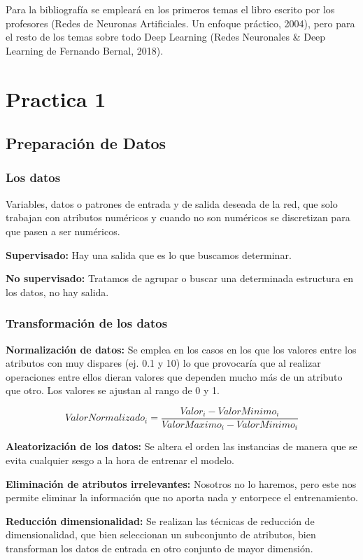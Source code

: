 \documentclass[12pt, twoside, openright]{report} %
\begin{document}
Para la bibliografía se empleará en los primeros temas el libro escrito por los profesores (Redes de Neuronas Artificiales. Un enfoque práctico, 2004), pero para el resto de los temas sobre todo Deep Learning (Redes Neuronales \& Deep Learning de Fernando Bernal, 2018).

\chapter{Practica 1}
\section{Preparación de Datos}
\subsection{Los datos}
Variables, datos o patrones de entrada y de salida deseada de la red, que solo trabajan con atributos numéricos y cuando no son numéricos se discretizan para que pasen a ser numéricos.

\textbf{Supervisado:} Hay una salida que es lo que buscamos determinar.

\textbf{No supervisado:} Tratamos de agrupar o buscar una determinada estructura en los datos, no hay salida.

\subsection{Transformación de los datos}
\textbf{Normalización de datos:} Se emplea en los casos en los que los valores entre los atributos con muy dispares (ej. 0.1 y 10) lo que provocaría que al realizar operaciones entre ellos dieran valores que dependen mucho más de un atributo que otro. Los valores se ajustan al rango de 0 y 1.

$$ValorNormalizado_i=\frac {Valor_i-ValorMinimo_i} {ValorMaximo_i-ValorMinimo_i}$$

\textbf{Aleatorización de los datos:} Se altera el orden las instancias de manera que se evita cualquier sesgo a la hora de entrenar el modelo.

\textbf{Eliminación de atributos irrelevantes:} Nosotros no lo haremos, pero este nos permite eliminar la información que no aporta nada y entorpece el entrenamiento.

\textbf{Reducción dimensionalidad:} Se realizan las técnicas de reducción de dimensionalidad, que bien seleccionan un subconjunto de atributos, bien transforman los datos de entrada en otro conjunto de mayor dimensión.
\end{document}
